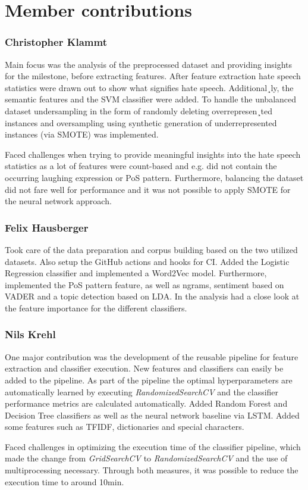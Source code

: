 \section*{Member contributions}

\subsubsection*{Christopher Klammt}

Main focus was the analysis of the preprocessed dataset and providing insights for the milestone, before extracting features. After feature extraction hate speech statistics were drawn out to show what signifies hate speech. Ad\-di\-tio\-nal\-¸ly, the semantic features and the SVM classifier were added. To handle the unbalanced dataset undersampling in the form of randomly deleting over\-re\-pre\-sen\-¸ted instances and oversampling using synthetic generation of underrepresented instances (via SMOTE) was implemented.

Faced challenges when trying to provide meaningful insights into the hate speech statistics as a lot of features were count-based and e.g. did not contain the occurring laughing expression or PoS pattern. Furthermore, balancing the dataset did not fare well for performance and it was not possible to apply SMOTE for the neural network approach.

\subsubsection*{Felix Hausberger}

Took care of the data preparation and corpus building based on the two utilized datasets. Also setup the GitHub actions and hooks for CI. Added the Logistic Regression classifier and implemented a Word2Vec model. Furthermore, implemented the PoS pattern feature, as well as ngrams, sentiment based on VADER and a topic detection based on LDA. In the analysis had a close look at the feature importance for the different classifiers.


\subsubsection*{Nils Krehl}

One major contribution was the development of the reusable pipeline for feature extraction and classifier execution. New features and classifiers can easily be added to the pipeline. As part of the pipeline the optimal hy\-per\-pa\-ra\-me\-ters are automatically learned by executing \textit{RandomizedSearchCV} and the classifier performance metrics are calculated automatically. Added Random Forest and Decision Tree classifiers as well as the neural network baseline via LSTM. Added some features such as TFIDF, dictionaries and special characters.

Faced challenges in optimizing the execution time of the classifier pipeline, which made the change from \textit{GridSearchCV} to \textit{RandomizedSearchCV} and the use of multiprocessing necessary. Through both measures, it was possible to reduce the execution time to around 10min. 
